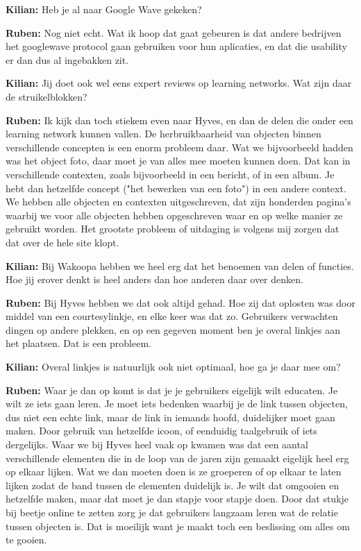\textbf{Kilian:} Heb je al naar Google Wave gekeken?

\textbf{Ruben:} Nog niet echt. Wat ik hoop dat gaat gebeuren is dat andere bedrijven het googlewave protocol gaan gebruiken voor hun aplicaties, en dat die usability er dan dus al ingebakken zit.

\textbf{Kilian:} Jij doet ook wel eens expert reviews op learning networks. Wat zijn daar de struikelblokken?

\textbf{Ruben:} Ik kijk dan toch stiekem even naar Hyves, en dan de delen die onder een learning network kunnen vallen. De herbruikbaarheid van objecten binnen verschillende concepten is een enorm probleem daar. Wat we bijvoorbeeld hadden was het object foto, daar moet je van alles mee moeten kunnen doen. Dat kan in verschillende contexten, zoals bijvoorbeeld in een bericht, of in een album. Je hebt dan hetzelfde concept ("het bewerken van een foto") in een andere context. We hebben alle objecten en contexten uitgeschreven, dat zijn honderden pagina's waarbij we voor alle objecten hebben opgeschreven waar en op welke manier ze gebruikt worden. Het grootste probleem of uitdaging is volgens mij zorgen dat dat over de hele site klopt.

\textbf{Kilian:} Bij Wakoopa hebben we heel erg dat het benoemen van delen of functies. Hoe jij erover denkt is heel anders dan hoe anderen daar over denken.

\textbf{Ruben:} Bij Hyves hebben we dat ook altijd gehad. Hoe zij dat oplosten was door middel van een courtesylinkje, en elke keer was dat zo. Gebruikers verwachten dingen op andere plekken, en op een gegeven moment ben je overal linkjes aan het plaatsen. Dat is een probleem.

\textbf{Kilian:} Overal linkjes is natuurlijk ook niet optimaal, hoe ga je daar mee om?

\textbf{Ruben:} Waar je dan op komt is dat je je gebruikers eigelijk wilt educaten. Je wilt ze iets gaan leren. Je moet iets bedenken waarbij je de link tussen objecten, dus niet een echte link, maar de link in iemands hoofd, duidelijker moet gaan maken. Door gebruik van hetzelfde icoon, of eenduidig taalgebruik of iets dergelijks. Waar we bij Hyves heel vaak op kwamen was dat een aantal verschillende elementen die in de loop van de jaren zijn gemaakt eigelijk heel erg op elkaar lijken. Wat we dan moeten doen is ze groeperen of op elkaar te laten lijken zodat de band tussen de elementen duidelijk is. Je wilt dat omgooien en hetzelfde maken, maar dat moet je dan stapje voor stapje doen. Door dat stukje bij beetje online te zetten zorg je dat gebruikers langzaam leren wat de relatie tussen objecten is. Dat is moeilijk want je maakt toch een beslissing om alles om te gooien.

